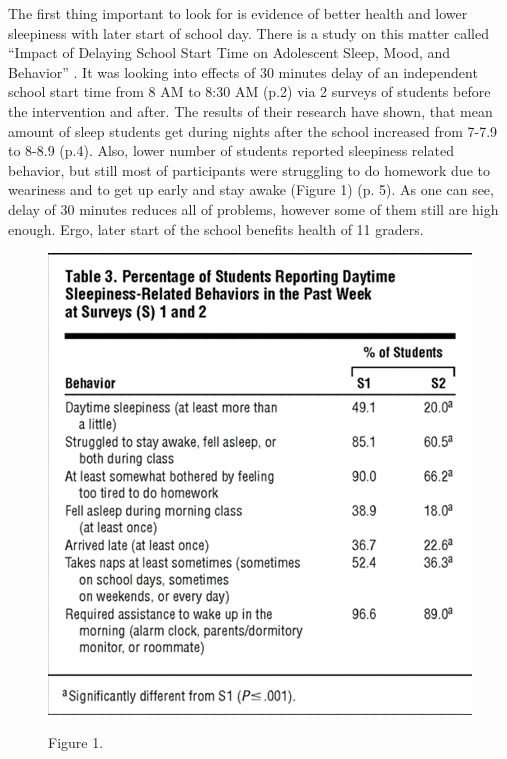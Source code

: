 \documentclass[12pt,a4paper,stu, donotrepeattitle, floatsintext]{apa7}
\begin{document}
The first thing important to look for is evidence of better health and lower sleepiness with later start of school day. There is a study on this matter called “Impact of Delaying School Start Time on Adolescent Sleep, Mood, and Behavior” \cite{Owens2010}. It was looking into effects of 30 minutes delay of an independent school start time from 8 AM to 8:30 AM (p.2) via 2 surveys of students before the intervention and after. The results of their research have shown, that mean amount of sleep students get during nights after the school increased from 7-7.9 to 8-8.9 (p.4). Also, lower number of students reported sleepiness related behavior, but still most of participants were struggling to do homework due to weariness and to get up early and stay awake (Figure 1) (p. 5). As one can see, delay of 30 minutes reduces all of problems, however some of them still are high enough. Ergo, later start of the school benefits health of 11 graders.

\begin{figure}[H]
    \includegraphics{picture1.png}
    \centering
    
    {Figure 1. \cite{Owens2010}}
\end{figure}
\end{document}
